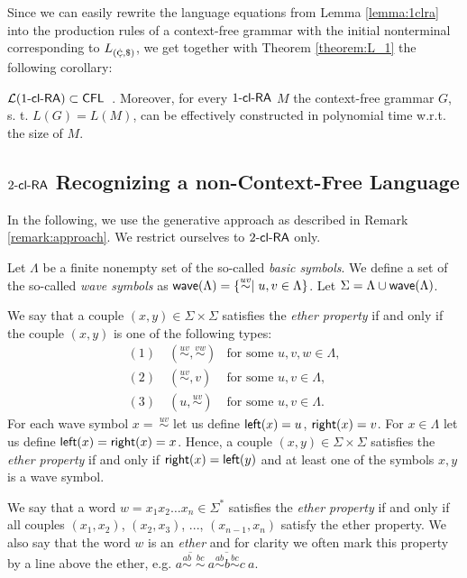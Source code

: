 Since we can easily rewrite the language equations from Lemma \ref{lemma:1clra}
into the production rules of a context-free grammar with the initial nonterminal corresponding to $L_{({\small \cent},\$)}$,
we get together with Theorem \ref{theorem:L_1} the following corollary:

\begin{corollary}\label{corollary:1clra_cfl}
$\calL{\kclRA[1]} \subset \CFL$\ . Moreover, for every $\kclRA[1]$ $M$ the context-free grammar $G$, s. t. $L(G) = L(M)$, can be effectively constructed in polynomial time w.r.t. the size of $M$.
\end{corollary}

\subsection{$\kclRA[2]$ Recognizing a non-Context-Free Language}\label{2clRA-non-CFL}

In the following, we use the generative approach as described in Remark \ref{remark:approach}. We restrict ourselves to $\kclRA[2]$ only.

\begin{definition}\label{definition:ether}
Let $\Lambda$ be a finite nonempty set of the so-called \emph{basic symbols}. We define a set of the so-called \emph{wave symbols} as $\wave(\Lambda) = \{\stackrel{uv}{\sim} \mid u,v \in \Lambda\}$. Let $\Sigma = \Lambda \cup \wave(\Lambda)$.

We say that a couple $(x, y) \in \Sigma \times \Sigma$ satisfies the \emph{ether property} if and only if the couple $(x, y)$ is one of the following types:
$$
\begin{array}{ll}
(1) \quad (\stackrel{uv}{\sim}, \stackrel{vw}{\sim}) 	& \mbox{for some } u, v, w \in \Lambda,\\
(2) \quad (\stackrel{uv}{\sim}, v)					& \mbox{for some } u, v \in \Lambda,\\
(3) \quad (u, \stackrel{uv}{\sim})					& \mbox{for some } u, v \in \Lambda.
\end{array}
$$
For each wave symbol $x =\ \stackrel{uv}{\sim}$ let us define ${\sf left}(x) = u$, ${\sf right}(x) = v$. For $x \in \Lambda$ let us define ${\sf left}(x) = {\sf right}(x) = x$. Hence, a couple $(x, y) \in \Sigma \times \Sigma$ satisfies the \emph{ether property} if and only if ${\sf right}(x) = {\sf left}(y)$ and at least one of the symbols $x, y$ is a wave symbol.

We say that a word $w = x_1 x_2 \ldots x_n \in \Sigma^*$ satisfies the \emph{ether property} if and only if all couples $(x_1, x_2)$, $(x_2, x_3)$, ..., $(x_{n-1}, x_n)$ satisfy the ether property. We also say that the word $w$ is an \emph{ether} and for clarity we often mark this property by a line above the ether, e.g. $\overline{a \stackrel{ab}{\sim} \; \stackrel{bc}{\sim}}\ \overline{a \stackrel{ab}{\sim} b \stackrel{bc}{\sim} c}\ a$.
\end{definition}

